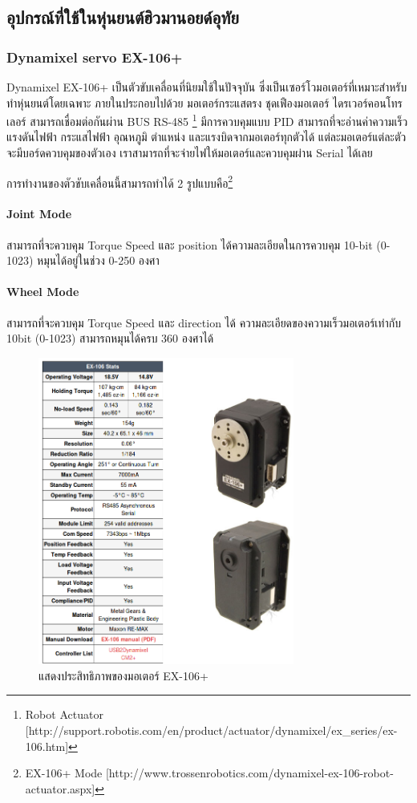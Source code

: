 \clearpage
\subsection{อุปกรณ์ที่ใช้ในหุ่นยนต์ฮิวมานอยด์อุทัย}

\subsubsection*{Dynamixel servo EX-106+}
Dynamixel EX-106+ เป็นตัวขับเคลื่อนที่นิยมใช้ในปัจจุบัน ซึ่งเป็นเซอร์โวมอเตอร์ที่เหมาะสำหรับทำหุ่นยนต์โดยเฉพาะ
ภายในประกอบไปด้วย มอเตอร์กระแสตรง ชุดเฟืองมอเตอร์ ไดรเวอร์คอนโทรเลอร์ สามารถเชื่อมต่อกันผ่าน BUS RS-485
\footnote{ Robot Actuator [http://support.robotis.com/en/product/actuator/dynamixel/ex\_series/ex-106.htm] }
มีการควบคุมแบบ PID สามารถที่จะอ่านค่าความเร็ว
แรงดันไฟฟ้า กระแสไฟฟ้า อุณหภูมิ ตำแหน่ง และแรงบิดจากมอเตอร์ทุกตัวได้ แต่ละมอเตอร์แต่ละตัวจะมีบอร์ดควบคุมของตัวเอง
เราสามารถที่จะจ่ายไฟให้มอเตอร์และควบคุมผ่าน Serial ได้เลย

การทำงานของตัวขับเคลื่อนนี้สามารถทำได้ 2 รูปแบบคือ\footnote{ EX-106+ Mode [http://www.trossenrobotics.com/dynamixel-ex-106-robot-actuator.aspx] }

\paragraph*{Joint Mode}
สามารถที่จะควบคุม Torque Speed และ position ได้ความละเอียดในการควบคุม 10-bit (0-1023) หมุนได้อยู่ในช่วง 0-250 องศา

\paragraph*{Wheel Mode}
สามารถที่จะควบคุม Torque Speed และ direction ได้ ความละเอียดของความเร็วมอเตอร์เท่ากับ 10bit (0-1023) สามารถหมุนได้ครบ 360 องศาได้

\begin{figure}[ht]
    \centering
    \includegraphics[width=0.75\textwidth]{chapter3/images/dxl_ex106.png}
    \caption{แสดงประสิทธิภาพของมอเตอร์ EX-106+}
    \label{fig:dxl_ex106}
\end{figure}

